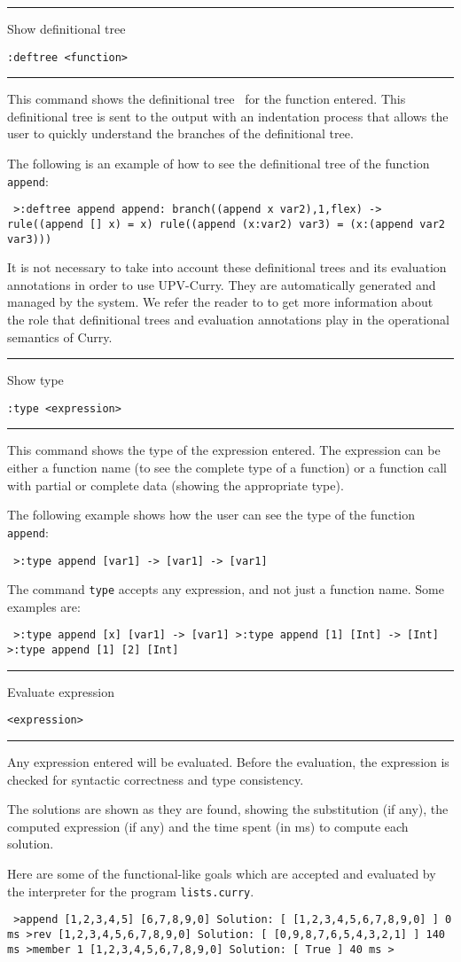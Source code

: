 \documentclass[titlepage,fleqn]{article}
\makeatletter
\newenvironment{prog}{\vspace{0.7ex}\par
\setlength{\parindent}{0.7cm}
\obeylines\@vobeyspaces\tt}
{\vspace{0.7ex}\noindent}
\newcommand{\iniprog}{\begin{prog}}
\newcommand{\finprog}{\end{prog}\noindent}
\newcommand{\pr}[1]{\mbox{\tt #1}}   %
\newcommand{\uptitle}[2]{ 
{
\noindent\rule{12.12cm}{.01in}
\vspace{0.25cm}
\noindent

{\large\sf #1}

\flushright 
\vspace{-0.78cm}
{\large\tt #2}
\vspace{0.1cm}

\noindent\rule{12.12cm}{.01in}
\vspace{0.2cm}
\hspace{-0.25cm}\noindent
}
}
\newcommand{\prompt}{\pr{>}}
\makeatother
\begin{document}
\uptitle{Show definitional tree}{:deftree <function>}
This command shows 
the definitional tree~\cite{Antoy92ALP}
for
the function entered. This definitional tree is sent to the output with an
indentation process that allows the user to quickly understand  the branches of
the definitional tree.

The following is an example of how to see the definitional tree 
of the function \pr{append}:
\iniprog
\prompt :deftree append
append:
branch((append x var2),1,flex) ->
 rule((append [] x) = x)
 rule((append (x:var2) var3) = (x:(append var2 var3)))
\finprog

It is not necessary to take into account these definitional trees and its
evaluation annotations in order to use UPV-Curry. 
They are automatically generated and managed by the system.
We refer the reader to \cite{Hanus98Curry} to
get more information about the role that definitional trees 
and evaluation annotations play in
the operational semantics of Curry.

\pagebreak
\uptitle{Show type}{:type <expression>}
 This command shows the type of the expression 
entered. The expression can be either a function name (to see the 
complete type of a function) or a function call with partial or complete data
(showing the appropriate type).

The following example shows how the user can see 
the type of the function \pr{append}:
\iniprog
\prompt :type append
[var1] -> [var1] -> [var1]
\finprog

The command \pr{type} accepts any expression, and not just a function name.
Some examples are:
\iniprog
\prompt :type append [x]
[var1] -> [var1]
\prompt :type append [1]
[Int] -> [Int]
\prompt :type append [1] [2]
[Int]
\finprog

\uptitle{Evaluate expression}{<expression>}
Any expression entered will be evaluated.
Before the evaluation, the 
expression is checked for syntactic correctness and type consistency.

The solutions are shown as they are found, showing the substitution (if any), 
the computed expression (if any) and the time spent (in ms)
to compute each solution.

Here are some of the functional-like goals which are accepted and evaluated
by the interpreter for the program \pr{lists.curry}.
\iniprog
\prompt append [1,2,3,4,5] [6,7,8,9,0]
Solution: [ [1,2,3,4,5,6,7,8,9,0] ] 0 ms
\prompt rev [1,2,3,4,5,6,7,8,9,0]
Solution: [ [0,9,8,7,6,5,4,3,2,1] ] 140 ms
\prompt member 1 [1,2,3,4,5,6,7,8,9,0]
Solution: [ True ] 40 ms
\prompt
\finprog
\end{document}
